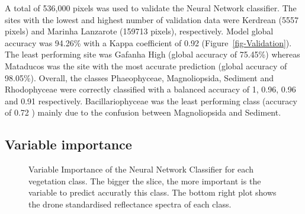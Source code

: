 \documentclass[
  number]{elsarticle}
\begin{document}
A total of 536,000 pixels was used to validate the Neural Network
classifier. The sites with the lowest and highest number of validation
data were Kerdrean (5557 pixels) and Marinha Lanzarote (159713 pixels),
respectively. Model global accuracy was 94.26\% with a Kappa coefficient
of 0.92 (Figure~\ref{fig-Validation}). The least performing site was
Gafanha High (global accuracy of 75.45\%) whereas Mataducos was the site
with the most accurate prediction (global accuracy of 98.05\%). Overall,
the classes Phaeophyceae, Magnoliopsida, Sediment and Rhodophyceae were
correctly classified with a balanced accuracy of 1, 0.96, 0.96 and 0.91
respectively. Bacillariophyceae was the least performing class (accuracy
of 0.72 ) mainly due to the confusion between Magnoliopsida and
Sediment.

\subsection{Variable importance}\label{variable-importance}

\label{cell-fig-VIP}
\begin{figure}[H]


\caption{\label{fig-VIP}Variable Importance of the Neural Network
Classifier for each vegetation class. The bigger the slice, the more
important is the variable to predict accuratly this class. The bottom
right plot shows the drone standardised reflectance spectra of each
class.}

\end{figure}%
\end{document}
